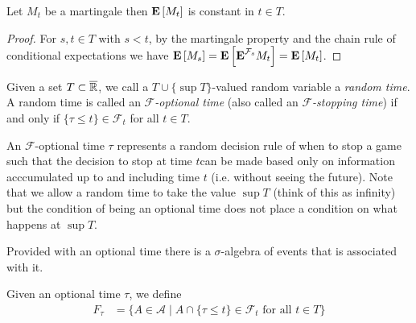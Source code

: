 \begin{lem}Let $M_t$ be a martingale then $\textbf{E}\left[M_t\right]$ is
  constant in $t \in T$.
\end{lem}
\begin{proof}For $s,t \in T$ with $s < t$, by the
  martingale property and the chain rule of
  conditional expectations we have
$\textbf{E}\left[M_s\right] = \textbf{E}\left[\textbf{E}^{\mathcal{F}_s} M_t\right] = \textbf{E}\left[M_t\right]$.
\end{proof}

\begin{defn}Given a set $T \subset \overline{\mathbb{R}}$, we call a $T
  \cup \lbrace \sup T \rbrace$-valued random variable a \emph{random
    time}.  A random time is called an
  \emph{$\mathcal{F}$-optional time} (also called an \emph{$\mathcal{F}$-stopping time}) if and only if $\lbrace \tau \leq
  t \rbrace \in \mathcal{F}_t$ for all $t \in T$.
\end{defn}

An $\mathcal{F}$-optional time $\tau$ represents a random decision
rule of when to stop a game such that the decision  to stop at time $t$can be made based only on
information acccumulated up to and including time $t$ (i.e. without
seeing the future).  Note that we allow a random time to take the value $\sup T$ (think of
this as infinity) but the condition of being an optional time does not
place a condition on what happens at $\sup T$.

Provided with an optional time there is a $\sigma$-algebra of events
that is associated with it.
\begin{defn}Given an optional time $\tau$, we define 
\begin{align*}
F_\tau &= \lbrace
  A \in \mathcal{A} \mid A \cap \lbrace \tau \leq t \rbrace\in
    \mathcal{F}_t \text{ for all } t \in T \rbrace
\end{align*}
\end{defn}

